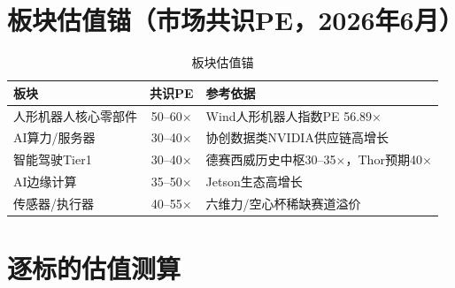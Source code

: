 \section{板块估值锚（市场共识PE，2026年6月）}

\begin{table}[H]
\centering\small
\renewcommand{\arraystretch}{1.2}
\begin{tabularx}{\textwidth}{l c X}
\toprule
\textbf{板块} & \textbf{共识PE} & \textbf{参考依据} \\
\midrule
人形机器人核心零部件 & 50--60$\times$ & Wind人形机器人指数PE 56.89$\times$ \\
AI算力/服务器 & 30--40$\times$ & 协创数据类NVIDIA供应链高增长 \\
智能驾驶Tier1 & 30--40$\times$ & 德赛西威历史中枢30--35$\times$，Thor预期40$\times$ \\
AI边缘计算 & 35--50$\times$ & Jetson生态高增长 \\
传感器/执行器 & 40--55$\times$ & 六维力/空心杯稀缺赛道溢价 \\
\bottomrule
\end{tabularx}
\caption{板块估值锚}
\end{table}

\section{逐标的估值测算}

